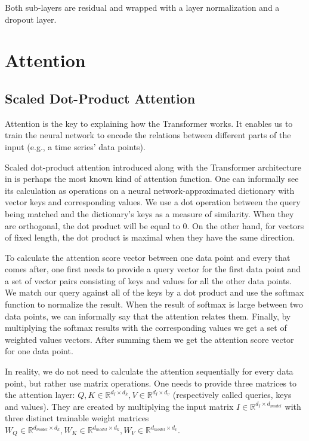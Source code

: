 \documentclass[en]{pracamgr}
\begin{document}
	Both sub-layers are residual and wrapped with a layer normalization and a dropout layer.
	
	\section{Attention}
	
	\subsection{Scaled Dot-Product Attention}
	
	Attention is the key to explaining how the Transformer works.
	It enables us to train the neural network to encode the relations between different parts of the input (e.g., a time series' data points).
	
	Scaled dot-product attention introduced along with the Transformer architecture in \cite{tr} is perhaps the most known kind of attention function.
	One can informally see its calculation as operations on a neural network-approximated dictionary with vector keys and corresponding values. We use a dot operation between the query being matched and the dictionary's keys as a measure of similarity. When they are orthogonal, the dot product will be equal to 0. On the other hand, for vectors of fixed length, the dot product is maximal when they have the same direction.
	
	To calculate the attention score vector between one data point and every that comes after, one first needs to provide a query vector for the first data point and a set of vector pairs consisting of keys and values for all the other data points. We match our query against all of the keys by a dot product and use the softmax function to normalize the result. When the result of softmax is large between two data points, we can informally say that the attention relates them. 
	Finally, by multiplying the softmax results with the corresponding values we get a set of weighted values vectors. After summing them we get the attention score vector for one data point.
	\newline
	
	In reality, we do not need to calculate the attention sequentially for every data point, but rather use matrix operations.
	One needs to provide three matrices to the attention layer: $Q, K \in \mathbb{R}^{d_I \times d_k}, V \in \mathbb{R}^{d_I \times d_v}$ (respectively called queries, keys and values). They are created by multiplying the input matrix $I \in \mathbb{R}^{d_I \times d_{model}}$ with three distinct trainable weight matrices $W_Q \in \mathbb{R}^{d_{model} \times d_k}, W_K \in \mathbb{R}^{d_{model} \times d_k}, W_V \in \mathbb{R}^{d_{model} \times d_v}$.
	
\end{document}
